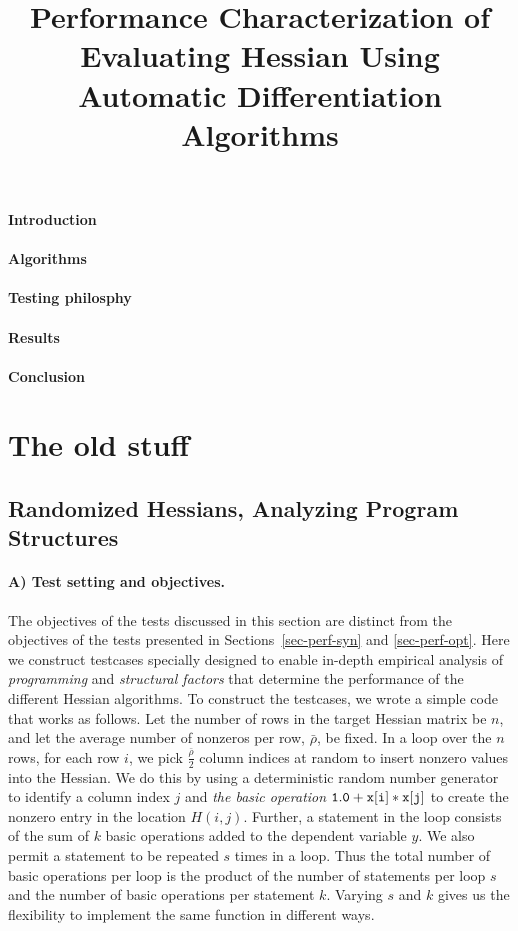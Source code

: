\documentclass[12pt]{article}
\begin{document}
\title{Performance Characterization of Evaluating Hessian Using Automatic Differentiation Algorithms}
\maketitle
\paragraph{Introduction}
\paragraph{Algorithms}
\paragraph{Testing philosphy}
\paragraph{Results}
\paragraph{Conclusion}

\appendix
\section{The old stuff}
\subsection{Randomized Hessians, Analyzing Program Structures}
\label{sec-perf-rand}

\label{sec-perf-random}

\paragraph{A) Test setting and objectives.}
The objectives of the tests discussed in this section are distinct from
the objectives of the tests presented in Sections~\ref{sec-perf-syn} and \ref{sec-perf-opt}.
Here we construct testcases specially designed to enable in-depth
empirical analysis of {\em programming} and {\em structural factors} that 
determine the performance of the  different Hessian algorithms. 
To construct the testcases, we wrote a simple code that works as follows. 
Let the number of rows in the target Hessian matrix be $n$, and
let the average number of nonzeros per row, $\bar{\rho}$, be fixed.
In a loop over the $n$ rows, for each row $i$, 
we pick $\frac{\bar{\rho}}{2}$ column indices at random to insert nonzero values into the Hessian.    
We do this by using a deterministic random number generator to identify a column index $j$ and {\em the basic operation} 
$\tt 1.0+x[i]*x[j]$ to create the nonzero entry in the location $H(i,j)$. 
Further, a statement in the loop consists of the sum of $k$ basic operations added to the dependent variable $y$. We also permit a statement to be repeated $s$ times in a loop. Thus the total number of basic operations per loop is the product of the number of statements per loop $s$ and the number of basic operations per statement $k$. Varying $s$ and $k$ gives us the flexibility to implement the same function in different ways.
\end{document}
